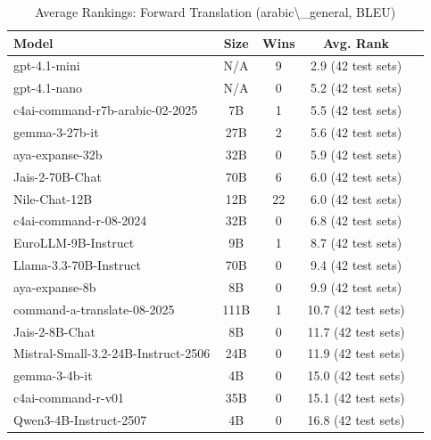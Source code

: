 \begin{table}[htbp]
\centering
\caption{Average Rankings: Forward Translation (arabic\textbackslash{}_general, BLEU)}
\label{tab:avg_rankings_bleu_arabic_general}
\begin{tabular}{l@{\hspace{3pt}}c@{\hspace{3pt}}c@{\hspace{3pt}}c@{\hspace{3pt}}c}
\toprule
Model & Size & Wins & Avg. Rank \\
\midrule
gpt-4.1-mini & N/A & 9 & 2.9 (42 test sets) \\
gpt-4.1-nano & N/A & 0 & 5.2 (42 test sets) \\
c4ai-command-r7b-arabic-02-2025 & 7B & 1 & 5.5 (42 test sets) \\
gemma-3-27b-it & 27B & 2 & 5.6 (42 test sets) \\
aya-expanse-32b & 32B & 0 & 5.9 (42 test sets) \\
Jais-2-70B-Chat & 70B & 6 & 6.0 (42 test sets) \\
Nile-Chat-12B & 12B & 22 & 6.0 (42 test sets) \\
c4ai-command-r-08-2024 & 32B & 0 & 6.8 (42 test sets) \\
EuroLLM-9B-Instruct & 9B & 1 & 8.7 (42 test sets) \\
Llama-3.3-70B-Instruct & 70B & 0 & 9.4 (42 test sets) \\
aya-expanse-8b & 8B & 0 & 9.9 (42 test sets) \\
command-a-translate-08-2025 & 111B & 1 & 10.7 (42 test sets) \\
Jais-2-8B-Chat & 8B & 0 & 11.7 (42 test sets) \\
Mistral-Small-3.2-24B-Instruct-2506 & 24B & 0 & 11.9 (42 test sets) \\
gemma-3-4b-it & 4B & 0 & 15.0 (42 test sets) \\
c4ai-command-r-v01 & 35B & 0 & 15.1 (42 test sets) \\
Qwen3-4B-Instruct-2507 & 4B & 0 & 16.8 (42 test sets) \\
\bottomrule
\end{tabular}
\end{table}